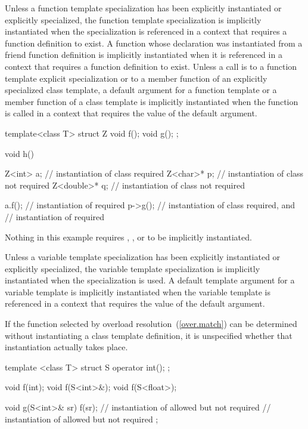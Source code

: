 \pnum
Unless a function template specialization has been explicitly instantiated or
explicitly specialized,
the function template specialization is implicitly instantiated when the
specialization is referenced in a context that requires a function definition
to exist.
A function whose declaration was instantiated from a friend function definition is
implicitly instantiated when it is referenced in a context that
requires a function definition to exist.
Unless a call is to a function template explicit specialization or
to a member function of an explicitly specialized class template,
a default argument for a function template or a member function of a
class template is implicitly instantiated when the function is
called in a context that requires the value of the default argument.

\pnum
\begin{example}
\begin{codeblock}
template<class T> struct Z {
  void f();
  void g();
};

void h() {
  Z<int> a;         // instantiation of class  required
  Z<char>* p;       // instantiation of class  not required
  Z<double>* q;     // instantiation of class  not required

  a.f();            // instantiation of  required
  p->g();           // instantiation of class  required, and
                    // instantiation of  required
}
\end{codeblock}

Nothing in this example requires
,
,
or
to be implicitly instantiated.
\end{example}

\pnum
Unless a variable template specialization has been explicitly instantiated or
explicitly specialized, the variable template specialization is implicitly
instantiated when the specialization is used. A default template argument for a
variable template is implicitly instantiated when the variable template is
referenced in a context that requires the value of the default argument.

\pnum
If the function selected by overload resolution~(\ref{over.match})
can be determined without instantiating a class template definition,
it is unspecified whether that instantiation actually takes place.
\begin{example}

\begin{codeblock}
template <class T> struct S {
  operator int();
};

void f(int);
void f(S<int>&);
void f(S<float>);

void g(S<int>& sr) {
  f(sr);            // instantiation of  allowed but not required
                    // instantiation of  allowed but not required
};
\end{codeblock}
\end{example}

